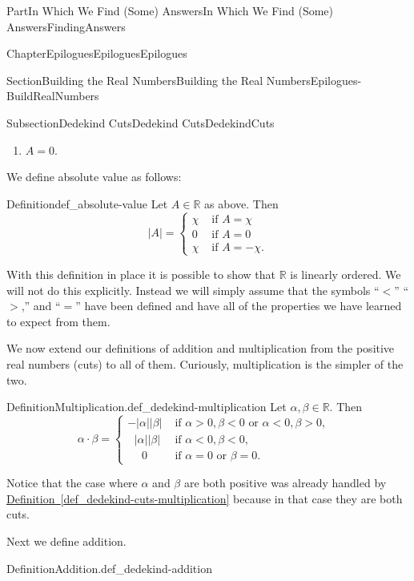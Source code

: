 \documentclass[oneside,10pt,]{book}
\newcommand{\xreffont}{\relax}
\numberwithin{equation}{part}
\newcommand{\abs}[1]{\left|#1\right|}
\newcommand{\RR}{\mathbb {R}}
\newcommand{\lt}{<}
\newcommand{\amp}{&}
\begin{document}
\begin{partptx}{Part}{In Which We Find (Some) Answers}{}{In Which We Find (Some) Answers}{}{}{FindingAnswers}
\begin{chapterptx}{Chapter}{Epilogues}{}{Epilogues}{}{}{Epilogues}
\begin{sectionptx}{Section}{Building the Real Numbers}{}{Building the Real Numbers}{}{}{Epilogues-BuildRealNumbers}
\begin{subsectionptx}{Subsection}{Dedekind Cuts}{}{Dedekind Cuts}{}{}{DedekindCuts}
\begin{enumerate}
\item{}\(A=0\).%
\end{enumerate}
%
\par
We define absolute value as follows:%
\begin{definition}{Definition}{}{def_absolute-value}%
%
Let \(A\in\RR\) as above. Then%
\begin{equation*}
\abs{A}= \begin{cases}\chi \amp  \text{ if \(A=\chi{}\)} \\ 0 \amp  \text{ if \(A=0\) } \\ \chi \amp  \text{ if \(A=-\chi{}.\)} {} \end{cases}
\end{equation*}
%
\end{definition}
With this definition in place it is possible to show that \(\RR\) is linearly ordered.  We will not do this explicitly.  Instead we will simply assume that the symbols ``\(\lt\)'' ``\(>\),'' and ``\(=\)'' have been defined and have all of the properties we have learned to expect from them.%
\par
We now extend our definitions of addition and multiplication from the positive real numbers (cuts) to all of them. Curiously, multiplication is the simpler of the two.%
\begin{definition}{Definition}{Multiplication.}{def_dedekind-multiplication}%
%
Let \(\alpha, \beta\in\RR\).  Then%
\begin{equation*}
\alpha\cdot\beta = \begin{cases}-\abs{\alpha}\abs{\beta}\amp  \text{ if \(\alpha>0,\beta\lt 0\) or \(\alpha\lt 0, \beta>0,\) }  \\ \ \ \,\abs{\alpha}\abs{\beta}\amp  \text{ if \(\alpha\lt 0,\beta\lt 0,\) }  \\ \ \ \ \ \ \, 0\amp  \text{ if \(\alpha=0\) or \(\beta=0.\) }  {} \end{cases}
\end{equation*}
%
\end{definition}
Notice that the case where \(\alpha\) and \(\beta\) are both positive was already handled by \hyperref[def_dedekind-cuts-multiplication]{Definition~{\xreffont\ref{def_dedekind-cuts-multiplication}}} because in that case they are both cuts.%
\par
Next we define addition.%
\begin{definition}{Definition}{Addition.}{def_dedekind-addition}%

\end{definition}
\end{subsectionptx}
\end{sectionptx}
\end{chapterptx}
\end{partptx}
\end{document}
